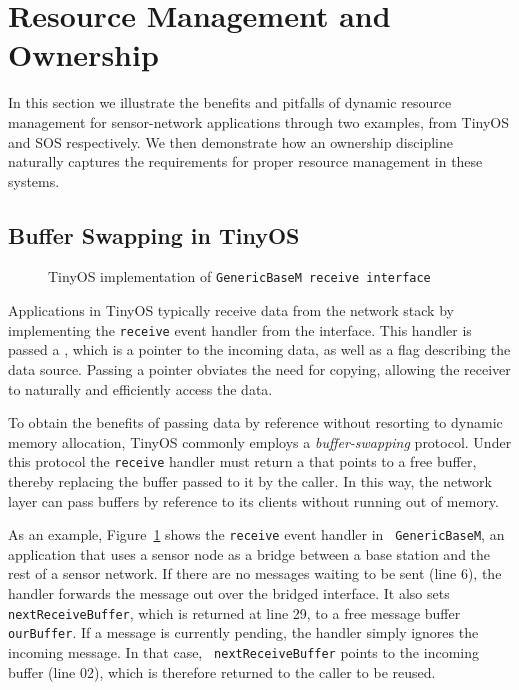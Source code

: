 \section{Resource Management and Ownership}
\label{sec:example}

In this section we illustrate the benefits and pitfalls of dynamic
resource management for sensor-network applications through two
examples, from TinyOS and SOS respectively.  We then demonstrate how
an ownership discipline naturally captures the requirements for proper
resource management in these systems.

\subsection{Buffer Swapping in TinyOS}

\begin{figure}[t]

\caption{TinyOS implementation of {\tt GenericBaseM receive
interface}\label{fig:genericbase}}
\end{figure}

Applications in TinyOS typically receive data from the network stack
by implementing the {\tt receive} event handler from the
 interface.  This handler is passed a
, which is a pointer to the incoming data, as well
as a flag describing the data source.  Passing a pointer 
obviates the need for copying, 
allowing the receiver to naturally and efficiently access the data.

To obtain the benefits of passing data by reference without resorting
to dynamic memory allocation, TinyOS commonly
employs a {\em buffer-swapping} protocol.  Under this protocol the
{\tt receive} handler must return a  that points to
a free buffer, thereby replacing the buffer passed to it by the caller.
In this way, the network layer can pass buffers by reference to its
clients without running out of memory.

As an example, 
Figure~\ref{fig:genericbase} shows 
the {\tt receive} event handler in {\tt
GenericBaseM}, an application that uses a sensor node as a bridge
between a base station and the rest of a sensor network.  
If there are no messages waiting to be sent (line 6), the handler
forwards the message out over the bridged interface.  It also sets
{\tt nextReceiveBuffer}, which is returned at line 29, to a free
message buffer {\tt ourBuffer}.  If a message is currently pending,
the handler simply ignores the incoming message.  In that case, {\tt
  nextReceiveBuffer} points to the incoming buffer (line 02), which
is therefore returned to the caller to be reused.

